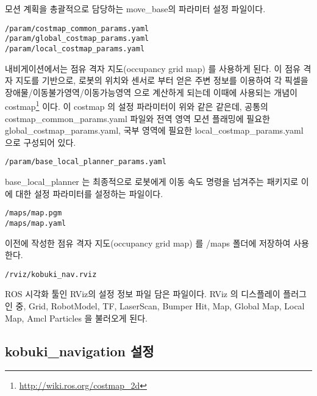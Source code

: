 모션 계획을 총괄적으로 담당하는 move\_base의 파라미터 설정 파일이다.

\vspace{\baselineskip}
\begin{lstlisting}[language=ROS]
/param/costmap_common_params.yaml
/param/global_costmap_params.yaml
/param/local_costmap_params.yaml
\end{lstlisting}

내비게이션에서는 점유 격자 지도(occupancy grid map) 를 사용하게 된다. 이 점유 격자 지도를 기반으로, 로봇의 위치와 센서로 부터 얻은 주변 정보를 이용하여 각 픽셀을 장애물/이동불가영역/이동가능영역 으로 계산하게 되는데 이때에 사용되는 개념이 costmap\footnote{\url{http://wiki.ros.org/costmap_2d}} 이다. 이 costmap 의 설정 파라미터이 위와 같은 같은데, 공통의 costmap\_common\_params.yaml 파일와 전역 영역 모션 플래밍에 필요한 global\_costmap\_params.yaml, 국부 영역에 필요한 local\_costmap\_params.yaml 으로 구성되어 있다.

\vspace{\baselineskip}
\begin{lstlisting}[language=ROS]
/param/base_local_planner_params.yaml
\end{lstlisting}

base\_local\_planner 는 최종적으로 로봇에게 이동 속도 명령을 넘겨주는 패키지로 이에 대한 설정 파라미터를 설정하는 파일이다.

\vspace{\baselineskip}
\begin{lstlisting}[language=ROS]
/maps/map.pgm
/maps/map.yaml
\end{lstlisting}

이전에 작성한 점유 격자 지도(occupancy grid map) 를 /maps 폴더에 저장하여 사용한다.

\vspace{\baselineskip}
\begin{lstlisting}[language=ROS]
/rviz/kobuki_nav.rviz
\end{lstlisting}

ROS 시각화 툴인 RViz의 설정 정보 파일 담은 파일이다. RViz 의 디스플레이 플러그인 중, Grid, RobotModel, TF, LaserScan, Bumper Hit, Map, Global Map, Local Map, Amcl Particles 을 불러오게 된다.

\subsection{kobuki\_navigation 설정}

